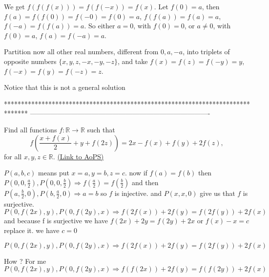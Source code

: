 \begin{solution}
	\begin{tcolorbox}We get $f(f(f(x))) = f(f(-x)) = f(x)$. Let $f(0) = a$, then $f(a) = f(f(0)) = f(-0) = f(0) = a$, $f(f(a)) = f(a) = a$, $f(-a) = f(f(a)) = a$. So either $a=0$, with $f(0)=0$, or $a\neq 0$, with $f(0)=a$, $f(a) = f(-a) = a$.

Partition now all other real numbers, different from $0,a,-a$, into triplets of opposite numbers $\{x,y,z,-x,-y,-z\}$, and take $f(x) = f(z) = f(-y) = y$, $f(-x) = f(y) = f(-z) =z$.\end{tcolorbox}
Notice that this is not a general solution
\end{solution}
*******************************************************************************
-------------------------------------------------------------------------------

\begin{problem}
	Find all functions $f:\mathbb{R}\to \mathbb{R}$ such that 
\[f\left(\frac{x+f(x)}{2}+y+f(2z)\right)=2x-f(x)+f(y)+2f(z), \]
for all $x,y,z \in \mathbb{R}.$
	\flushright \href{https://artofproblemsolving.com/community/c6h442598}{(Link to AoPS)}
\end{problem}



\begin{solution}
	$P(a,b,c) $ means put $x=a,y=b,z=c$. 
now if $f(a)=f(b) $ then  $P(0,0,\frac {a}{2}), P(0,0, \frac{b}{2}) \Rightarrow f(\frac{a}{2})=f(\frac{b}{2})$ and then $P(a,\frac{b}{2},0),P(b,\frac{a}{2},0) \Rightarrow a=b $
so $f$ is injective. and $P(x,x,0)$ give us that $f$ is surjective.
$P(0,f(2x),y),P(0,f(2y),x) \Rightarrow f(2f(x))+2f(y)=f(2f(y))+2f(x)$ and because f is surjective we have $f(2x)+2y=f(2y)+2x$ or $f(x)-x=c$
replace it. we have $c=0$
\end{solution}



\begin{solution}
	\begin{tcolorbox}$P(0,f(2x),y),P(0,f(2y),x) \Rightarrow f(2f(x))+2f(y)=f(2f(y))+2f(x)$ \end{tcolorbox}
How ? For me $P(0,f(2x),y),P(0,f(2y),x) \Rightarrow f(f(2x))+2f(y)=f(f(2y))+2f(x)$
\end{solution}



